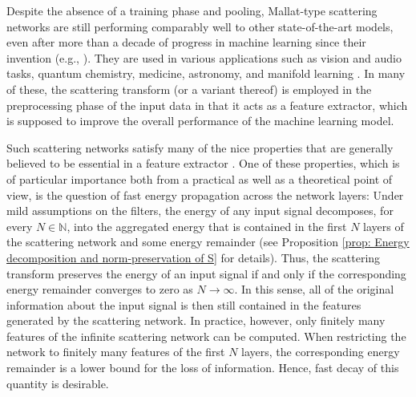 \documentclass[11pt]{amsart}
\newcommand{\N}{\mathbb{N}}
\newenvironment{proof sketch} {\textit{Proof sketch.}}{}
\begin{document}
  Despite the absence of a training phase and pooling, Mallat-type scattering networks are still performing comparably well to other state-of-the-art models, even after more than a decade of progress in machine learning since their invention (e.g., \cite{su2023wavelets,zhao20233d}).  
  They are used in various applications such as vision and audio tasks, quantum chemistry, medicine, astronomy, and manifold learning \cite{anden2015joint,chew2024geometric,eickenberg2018solid,gao2019geometric,hirn2017quantum,sinz2020wavelet,tolley2024wavelet,tschannen2016heart}. In many of these, the scattering transform (or a variant thereof) is employed in the preprocessing phase of the input data in that it acts as a feature extractor, which is supposed to improve the overall performance of the machine learning model.
  
  Such scattering networks satisfy many of the nice properties that are generally believed to be essential in a feature extractor \cite{mallat2012group,mallat2016understanding,wiatowski2017mathematical,nicola2023stability}. 
  One of these properties, which is of particular importance both from a practical as well as a theoretical point of view, is the question of fast energy propagation across the network layers: Under mild assumptions on the filters, the energy of any input signal 
  decomposes, for every $N \in \N$, into the aggregated energy that is contained in the first $N$ layers of the scattering network 
  and some energy remainder (see Proposition \ref{prop: Energy decomposition and norm-preservation of S} for details). Thus, the scattering transform preserves the energy of an input signal if and only if the corresponding energy remainder converges to zero as $N\to \infty$. In this sense, all of the original information about the input signal is then still contained in the features generated by the scattering network. In practice, however, only finitely many features of the infinite scattering network can be computed. When restricting the network to finitely many features of the first $N$ layers, the corresponding energy remainder is a lower bound for the loss of information. Hence, fast decay of this quantity is desirable.
  
\end{document}
